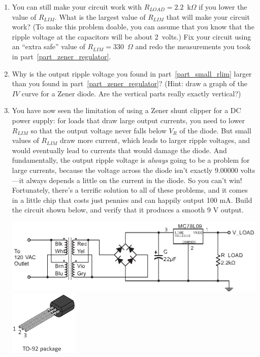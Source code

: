 \begin{enumerate}[wide]
\item You can still make your circuit work with $R_{LOAD} = 2.2$~k$\Omega$ if you lower the value of $R_{LIM}$.  What is the largest value of $R_{LIM}$ that will make your circuit work?  (To make this problem doable, you can assume that you know that the ripple voltage at the capacitors will be about 2~volts.)  Fix your circuit using an ``extra safe'' value of $R_{LIM}=330$~$\Omega$ and redo the measurements you took in part~\ref{part_zener_regulator}.  \label{part_small_rlim}

\item Why is the output ripple voltage you found in part~\ref{part_small_rlim} larger than you found in part~\ref{part_zener_regulator}?  (Hint: draw a graph of the $IV$ curve for a Zener diode.  Are the vertical parts really exactly vertical?)

\item You have now seen the limitation of using a Zener shunt clipper for a DC power supply: for loads that draw large output currents, you need to lower $R_{LIM}$ so that the output voltage never falls below $V_R$ of the diode.  But small values of $R_{LIM}$ draw more current, which leads to larger ripple voltages, and would eventually lead to currents that would damage the diode.  And fundamentally, the output ripple voltage is \textit{always} going to be a problem for large currents, because the voltage across the diode isn't exactly 9.00000 volts---it always depends a little on the current in the diode.  So you can't win!  Fortunately, there's a terrific solution to all of these problems, and it comes in a little chip that costs just pennies and can happily output 100 mA.  Build the circuit shown below, and verify that it produces a smooth 9 V output.
\begin{center}
\includegraphics{power_supply/7809_regulator.eps}
\includegraphics[width=1.3in]{appendices/pinouts/TO-92_package_pinout.eps}
\end{center}
 

\end{enumerate}
